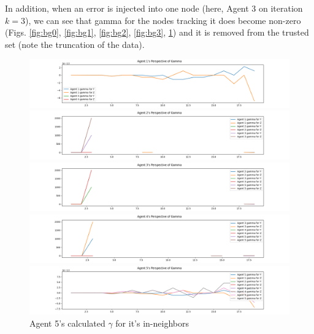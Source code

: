 \documentclass[11pt]{article}
\begin{document}
In addition, when an error is injected into one node (here, Agent 3 on iteration $k=3$),
we can see that gamma for the nodes tracking it does become non-zero
(Figs. \ref{fig:bg0}, \ref{fig:bg1}, \ref{fig:bg2}, \ref{fig:bg3}, \ref{fig:bg4})
and it is removed from the trusted set (note the truncation of the data).
\begin{figure}[h!]
    \centering
    \includegraphics[width=\textwidth]{img/error_agent_0_gammas.png}
    \caption{Agent 1's calculated $\gamma$ for it's in-neighbors}
    \label{fig:bg0}

    \includegraphics[width=\textwidth]{img/error_agent_1_gammas.png}
    \caption{Agent 2's calculated $\gamma$ for it's in-neighbors}
    \label{fig:bg1}

    \includegraphics[width=\textwidth]{img/error_agent_2_gammas.png}
    \caption{Agent 3's calculated $\gamma$ for it's in-neighbors}
    \label{fig:bg2}

    \includegraphics[width=\textwidth]{img/error_agent_3_gammas.png}
    \caption{Agent 4's calculated $\gamma$ for it's in-neighbors}
    \label{fig:bg3}

    \includegraphics[width=\textwidth]{img/error_agent_4_gammas.png}
    \caption{Agent 5's calculated $\gamma$ for it's in-neighbors}
    \label{fig:bg4}
\end{figure}
\end{document}
